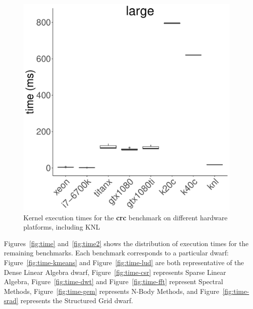 \documentclass[../document.tex]{subfiles}
\begin{document}
\begin{figure}[t]
	\includegraphics[width=\plotwidth]{figures/time-results/generate_crc_large_boxplot_knl-1}
	\caption{Kernel execution times for the {\bf crc} benchmark on different hardware platforms, including KNL}
	\label{fig:time-crc}
\end{figure}

Figures~\ref{fig:time} and~\ref{fig:time2} shows the distribution of execution times for the remaining benchmarks.
Each benchmark corresponds to a particular dwarf: Figure~\ref{fig:time-kmeans} and Figure~\ref{fig:time-lud} are both representative of the Dense Linear Algebra dwarf, Figure~\ref{fig:time-csr} represents Sparse Linear Algebra, Figure~\ref{fig:time-dwt} and Figure~\ref{fig:time-fft} represent Spectral Methods,
Figure~\ref{fig:time-gem} represents N-Body Methods, and Figure~\ref{fig:time-srad} represents the Structured Grid dwarf.

\captionsetup[subfigure]{justification=raggedright,singlelinecheck=false}
\end{document}
